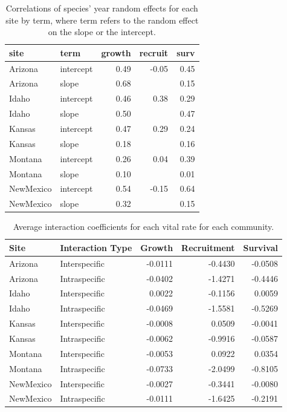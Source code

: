 \documentclass[12pt,]{article}
\begin{document}
\begin{table}[ht]
\centering
\caption{Correlations of species' year random effects for each site by term, where term refers to the random effect on the slope or the intercept.} 
\begin{tabular}{llrrr}
  \hline
site & term & growth & recruit & surv \\ 
  \hline
Arizona & intercept & 0.49 & -0.05 & 0.45 \\ 
  Arizona & slope & 0.68 &  & 0.15 \\ 
  Idaho & intercept & 0.46 & 0.38 & 0.29 \\ 
  Idaho & slope & 0.50 &  & 0.47 \\ 
  Kansas & intercept & 0.47 & 0.29 & 0.24 \\ 
  Kansas & slope & 0.18 &  & 0.16 \\ 
  Montana & intercept & 0.26 & 0.04 & 0.39 \\ 
  Montana & slope & 0.10 &  & 0.01 \\ 
  NewMexico & intercept & 0.54 & -0.15 & 0.64 \\ 
  NewMexico & slope & 0.32 &  & 0.15 \\ 
   \hline
\end{tabular}
\end{table}

\begin{table}[ht]
\centering
\caption{Average interaction coefficients for each vital rate for each community.} 
\begin{tabular}{llrrr}
  \hline
Site & Interaction Type & Growth & Recruitment & Survival \\ 
  \hline
Arizona & Interspecific & -0.0111 & -0.4430 & -0.0508 \\ 
  Arizona & Intraspecific & -0.0402 & -1.4271 & -0.4446 \\ 
  Idaho & Interspecific & 0.0022 & -0.1156 & 0.0059 \\ 
  Idaho & Intraspecific & -0.0469 & -1.5581 & -0.5269 \\ 
  Kansas & Interspecific & -0.0008 & 0.0509 & -0.0041 \\ 
  Kansas & Intraspecific & -0.0062 & -0.9916 & -0.0587 \\ 
  Montana & Interspecific & -0.0053 & 0.0922 & 0.0354 \\ 
  Montana & Intraspecific & -0.0733 & -2.0499 & -0.8105 \\ 
  NewMexico & Interspecific & -0.0027 & -0.3441 & -0.0080 \\ 
  NewMexico & Intraspecific & -0.0111 & -1.6425 & -0.2191 \\ 
   \hline
\end{tabular}
\end{table}
\end{document}
